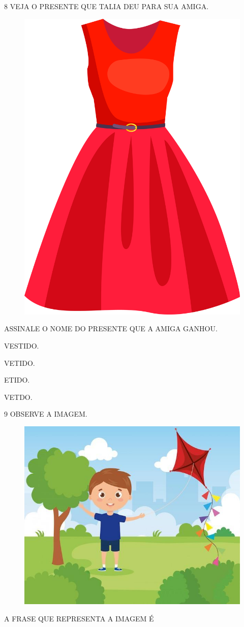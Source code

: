 \num{8} VEJA O PRESENTE QUE TALIA DEU PARA SUA AMIGA.

\begin{figure}[H]
\centering
\includegraphics[width=.4\textwidth]{media/image232.png}
\end{figure}

ASSINALE O NOME DO PRESENTE QUE A AMIGA GANHOU.

\begin{multicols}{2}
\begin{escolha}
\item VESTIDO.

\item VETIDO.

\item ETIDO.

\item VETDO.
\end{escolha}
\end{multicols}

\num{9} OBSERVE A IMAGEM.

\begin{figure}[H]
\centering
\includegraphics[width=.5\textwidth]{media/image233.jpg}
\end{figure}

A FRASE QUE REPRESENTA A IMAGEM É

